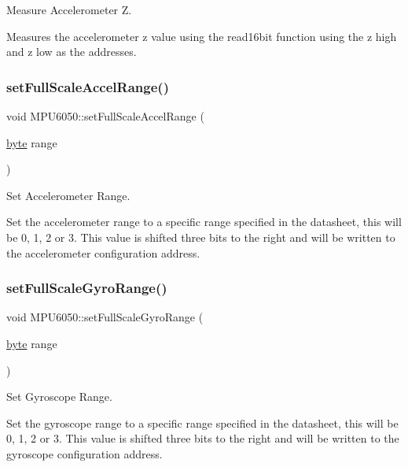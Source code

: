 Measure Accelerometer Z. 

Measures the accelerometer z value using the read16bit function using the z high and z low as the addresses. \mbox{\label{class_m_p_u6050_ad97b755c7023408decb2178fd6c0de96}} 
\subsubsection{\texorpdfstring{set\+Full\+Scale\+Accel\+Range()}{setFullScaleAccelRange()}}
{\footnotesize\ttfamily void M\+P\+U6050\+::set\+Full\+Scale\+Accel\+Range (\begin{DoxyParamCaption}\item[{\mbox{\hyperlink{_m_p_u6050_8hpp_a71809484a26cd96c6abe839a0a8a289d}{byte}}}]{range }\end{DoxyParamCaption})}



Set Accelerometer Range. 

Set the accelerometer range to a specific range specified in the datasheet, this will be 0, 1, 2 or 3. This value is shifted three bits to the right and will be written to the accelerometer configuration address. \mbox{\label{class_m_p_u6050_afae60a3ddfba42ead3c29069e3715e11}} 
\subsubsection{\texorpdfstring{set\+Full\+Scale\+Gyro\+Range()}{setFullScaleGyroRange()}}
{\footnotesize\ttfamily void M\+P\+U6050\+::set\+Full\+Scale\+Gyro\+Range (\begin{DoxyParamCaption}\item[{\mbox{\hyperlink{_m_p_u6050_8hpp_a71809484a26cd96c6abe839a0a8a289d}{byte}}}]{range }\end{DoxyParamCaption})}



Set Gyroscope Range. 

Set the gyroscope range to a specific range specified in the datasheet, this will be 0, 1, 2 or 3. This value is shifted three bits to the right and will be written to the gyroscope configuration address. \mbox{\label{class_m_p_u6050_aaf1a878aa47a35907b583beb4cbcff23}} 
